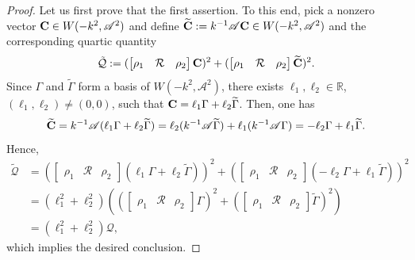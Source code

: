 \documentclass[11pt,a4paper,oneside]{amsart}
\theoremstyle{plain}
\theoremstyle{remark}
\numberwithin{equation}{section}
\newcommand{\R}{\mathbb{R}}
\theoremstyle{definition}
\begin{document}
\begin{proof}
Let us first prove that the first assertion.
To this end, pick a nonzero vector ${\bf C} \in W(-k^2,\mathscr{A}^2)$ and define
$
	\widetilde{{\bf C}}
	:= k^{-1}\mathscr{A}
	{\bf C}
\in W(-k^2,\mathscr{A}^2)$
and the corresponding quartic quantity
\[
	\tilde{\mathcal{Q}}:= (\begin{bmatrix}
	\rho_1 & \mathcal{R} & \rho_2
	\end{bmatrix}{\bf C})^2 +
(\begin{bmatrix}
	\rho_1 & \mathcal{R} & \rho_2
	\end{bmatrix}\widetilde{\bf C})^2.
\]
Since $\Gamma$ and
$\widetilde{\Gamma}$ form a basis of $W(-k^2,\mathscr{A}^2)$, there exists $\ell_1,\ell_2 \in \R$, $(\ell_1,\ell_2)\neq(0,0)$, such that
${\bf C} = \ell_1 \Gamma +  \ell_2 \widetilde{\Gamma}$.
Then, one has 
\[
\widetilde{\bf C} =
k^{-1}\mathscr{A}
	(\ell_1 \Gamma +  \ell_2 \widetilde{\Gamma})
	= \ell_2 (k^{-1}\mathscr{A}\widetilde{\Gamma}) + \ell_1
	(k^{-1}\mathscr{A}\Gamma)
= -\ell_2 \Gamma +  \ell_1 \widetilde{\Gamma}.
\]
Hence,
\begin{align*}
	\tilde{\mathcal{Q}}&= (\begin{bmatrix}
	\rho_1 & \mathcal{R} & \rho_2
	\end{bmatrix}(\ell_1 \Gamma +  \ell_2 \widetilde{\Gamma}))^2 +
(\begin{bmatrix}
	\rho_1 & \mathcal{R} & \rho_2
	\end{bmatrix}(-\ell_2 \Gamma +  \ell_1 \widetilde{\Gamma}))^2 \\
&= (\ell_1^2+\ell_2^2) ((\begin{bmatrix}
	\rho_1 & \mathcal{R} & \rho_2
	\end{bmatrix}\Gamma)^2
	+(\begin{bmatrix}
	\rho_1 & \mathcal{R} & \rho_2
	\end{bmatrix} \widetilde{\Gamma})^2)\\
&= (\ell_1^2+\ell_2^2)\mathcal{Q},
\end{align*}
which implies the desired conclusion.


\end{proof}
\end{document}
